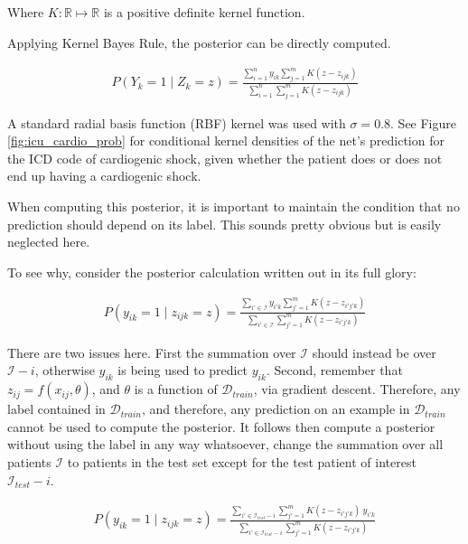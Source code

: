 Where $K: \mathbb{R} \mapsto \mathbb{R}$ is a positive definite kernel function.

Applying Kernel Bayes Rule, the posterior can be directly computed.

\begin{gather}
    P(Y_k = 1 \mid Z_k = z) = \frac
        {\sum_{i=1}^n y_{ik} \sum_{j=1}^m K(z - z_{ijk})}
        {\sum_{i=1}^n \sum_{j=1}^m K(z - z_{ijk})}
\end{gather}

A standard radial basis function (RBF) kernel was used with $\sigma = 0.8$.  See Figure \ref{fig:icu_cardio_prob} for conditional kernel densities of the net's prediction for the ICD code of cardiogenic shock, given whether the patient does or does not end up having a cardiogenic shock.

When computing this posterior, it is important to maintain the condition that no prediction should depend on its label.  This sounds pretty obvious but is easily neglected here.

To see why, consider the posterior calculation written out in its full glory:

\begin{gather}
    P(y_{ik} = 1 \mid z_{ijk} = z) = \frac
        {\sum_{i' \in \mathcal{I}} y_{i'k} \sum_{j'=1}^m K(z - z_{i'j'k})}
        {\sum_{i' \in \mathcal{I}} \sum_{j'=1}^m K(z - z_{i'j'k})}
\end{gather}

There are two issues here.  First the summation over $\mathcal{I}$ should instead be over $\mathcal{I} - i$, otherwise $y_{ik}$ is being used to predict $y_{ik}$.  Second, remember that $z_{ij} = f(x_{ij}, \theta)$, and $\theta$ is a function of $\mathcal{D}_{train}$, via gradient descent.  Therefore, any label contained in $\mathcal{D}_{train}$, and therefore, any prediction on an example in $\mathcal{D}_{train}$ cannot be used to compute the posterior.  It follows then compute a posterior without using the label in any way whatsoever, change the summation over all patients $\mathcal{I}$ to patients in the test set except for the test patient of interest $\mathcal{I}_{test} - i$.

\begin{gather}
    P(y_{ik} = 1 \mid z_{ijk} = z) = \frac
        {\sum_{i' \in \mathcal{I}_{test} - i} \sum_{j'=1}^m K(z - z_{i'j'k}) \ y_{i'k}}
        {\sum_{i' \in \mathcal{I}_{test} - i} \sum_{j'=1}^m K(z - z_{i'j'k})}
\end{gather}

